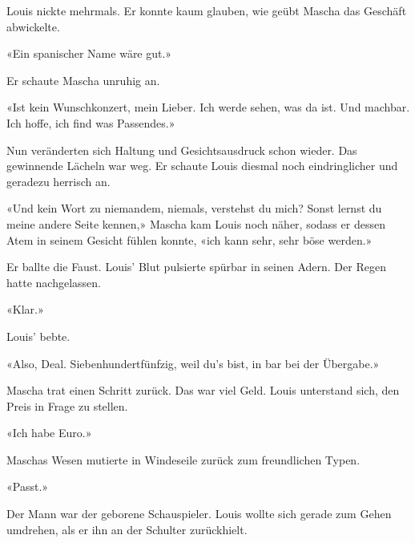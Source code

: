 Louis nickte mehrmals. Er konnte kaum glauben, wie geübt Mascha das
Geschäft abwickelte.

«Ein spanischer Name wäre gut.»

Er schaute Mascha unruhig an.

«Ist kein Wunschkonzert, mein Lieber. Ich werde sehen, was da ist. Und
machbar. Ich hoffe, ich find was Passendes.»

Nun veränderten sich Haltung und Gesichtsausdruck schon wieder. Das
gewinnende Lächeln war weg.
Er schaute Louis diesmal noch eindringlicher und geradezu herrisch an.

«Und kein Wort zu niemandem, niemals, verstehst du mich? Sonst lernst du
meine andere Seite kennen,» Mascha kam Louis noch näher, sodass er
dessen Atem in seinem Gesicht fühlen konnte, «ich kann sehr, sehr böse
werden.»

Er ballte die Faust. Louis’ Blut pulsierte spürbar in seinen Adern. Der
Regen hatte nachgelassen.

«Klar.»

Louis’ bebte.

«Also, Deal. Siebenhundertfünfzig, weil du’s bist, in bar bei der
Übergabe.»

Mascha trat einen Schritt zurück. Das war viel Geld. Louis unterstand
sich, den Preis in Frage zu stellen.

«Ich habe Euro.»

Maschas Wesen mutierte in Windeseile zurück zum freundlichen Typen.

«Passt.»

Der Mann war der geborene Schauspieler.
Louis wollte sich gerade zum Gehen umdrehen, als er ihn an der Schulter
zurückhielt.
